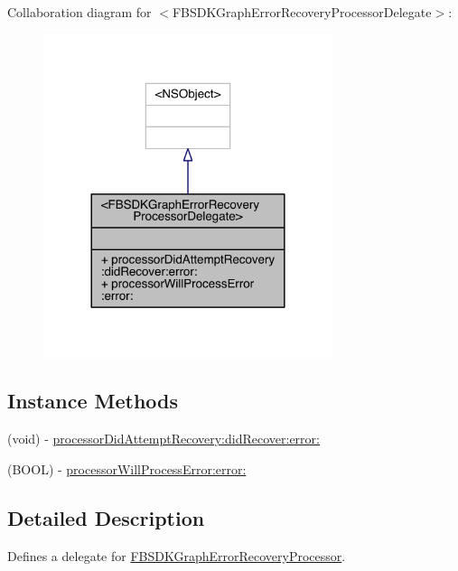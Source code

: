 Collaboration diagram for $<$F\-B\-S\-D\-K\-Graph\-Error\-Recovery\-Processor\-Delegate$>$\-:
\nopagebreak
\begin{figure}[H]
\begin{center}
\leavevmode
\includegraphics[width=240pt]{protocol_f_b_s_d_k_graph_error_recovery_processor_delegate-p__coll__graph}
\end{center}
\end{figure}
\subsection*{Instance Methods}
\begin{DoxyCompactItemize}
\item 
(void) -\/ \hyperlink{protocol_f_b_s_d_k_graph_error_recovery_processor_delegate-p_af555ae9c334da574281481928575bd28}{processor\-Did\-Attempt\-Recovery\-:did\-Recover\-:error\-:}
\item 
(B\-O\-O\-L) -\/ \hyperlink{protocol_f_b_s_d_k_graph_error_recovery_processor_delegate-p_a03db93d774a8a33632faf1e32d458da9}{processor\-Will\-Process\-Error\-:error\-:}
\end{DoxyCompactItemize}


\subsection{Detailed Description}
Defines a delegate for {\ttfamily \hyperlink{interface_f_b_s_d_k_graph_error_recovery_processor}{F\-B\-S\-D\-K\-Graph\-Error\-Recovery\-Processor}}. 


